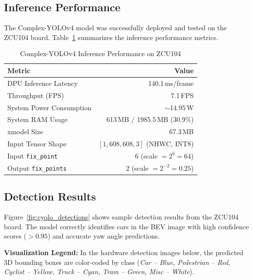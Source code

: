 \documentclass[12pt, a4paper]{report}
\begin{document}
\subsection{Inference Performance}

The Complex-YOLOv4 model was successfully deployed and tested on the ZCU104 board. Table~\ref{tab:cyolo_perf} summarizes the inference performance metrics.

\begin{table}[H]
\centering
\caption{Complex-YOLOv4 Inference Performance on ZCU104}
\label{tab:cyolo_perf}
\begin{tabular}{@{}lr@{}}
\toprule
\textbf{Metric} & \textbf{Value} \\
\midrule
DPU Inference Latency & 140.1\,ms/frame \\
Throughput (FPS) & 7.1\,FPS \\
System Power Consumption & $\sim$14.95\,W \\
System RAM Usage & 613\,MB / 1985.5\,MB (30.9\%) \\
xmodel Size & 67.3\,MB \\
Input Tensor Shape & $[1, 608, 608, 3]$ (NHWC, INT8) \\
Input \texttt{fix\_point} & 6 (scale $= 2^6 = 64$) \\
Output \texttt{fix\_points} & 2 (scale $= 2^{-2} = 0.25$) \\
\bottomrule
\end{tabular}
\end{table}

\subsection{Detection Results}

Figure~\ref{fig:cyolo_detections} shows sample detection results from the ZCU104 board. The model correctly identifies cars in the BEV image with high confidence scores ($>0.95$) and accurate yaw angle predictions.

\textbf{Visualization Legend:} In the hardware detection images below, the predicted 3D bounding boxes are color-coded by class (\textit{Car -- Blue, Pedestrian -- Red, Cyclist -- Yellow, Truck -- Cyan, Tram -- Green, Misc -- White}).
\end{document}
